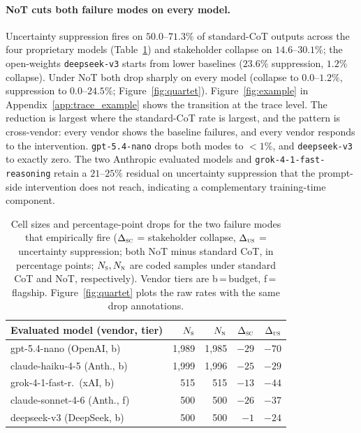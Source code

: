 \documentclass[11pt]{article}
\begin{document}
\paragraph{NoT cuts both failure modes on every model.}
Uncertainty suppression fires on $50.0$--$71.3\%$ of standard-CoT
outputs across the four proprietary models (Table~\ref{tab:firing})
and stakeholder collapse on $14.6$--$30.1\%$; the open-weights
\texttt{deepseek-v3} starts from lower baselines ($23.6\%$
suppression, $1.2\%$ collapse). Under NoT both drop
sharply on every model (collapse to $0.0$--$1.2\%$, suppression to
$0.0$--$24.5\%$;
Figure~\ref{fig:quartet}). Figure~\ref{fig:example} in
Appendix~\ref{app:trace_example} shows the transition at the trace
level. The reduction is largest where the
standard-CoT rate is largest, and the pattern is cross-vendor: every
vendor shows the baseline failures, and every vendor responds to the
intervention.
\texttt{gpt-5.4-nano} drops both modes to ${<}1\%$, and
\texttt{deepseek-v3} to exactly zero. The two Anthropic
evaluated models and \texttt{grok-4-1-fast-reasoning} retain a
$21$--$25\%$ residual on uncertainty suppression
that the prompt-side intervention does not reach, indicating a
complementary training-time component.

\begin{table}[t]
\centering
\small
\setlength{\tabcolsep}{4pt}
\begin{tabular}{lrrrr}
\toprule
Evaluated model (vendor, tier) & $N_{\textsc{s}}$ & $N_{\textsc{n}}$ & $\Delta_{\textsc{sc}}$ & $\Delta_{\textsc{us}}$ \\
\midrule
gpt-5.4-nano (OpenAI, b)        & 1{,}989 & 1{,}985 & $-29$ & $-70$ \\
claude-haiku-4-5 (Anth., b)     & 1{,}999 & 1{,}996 & $-25$ & $-29$ \\
grok-4-1-fast-r.\ (xAI, b)      &   515   &   515   & $-13$ & $-44$ \\
claude-sonnet-4-6 (Anth., f)    &   500   &   500   & $-26$ & $-37$ \\
deepseek-v3 (DeepSeek, b)       &   500   &   500   & $-1$  & $-24$ \\
\bottomrule
\end{tabular}
\caption{Cell sizes and percentage-point drops for the two failure
modes that empirically fire ($\Delta_{\textsc{sc}}$ = stakeholder
collapse, $\Delta_{\textsc{us}}$ = uncertainty suppression; both
NoT minus standard CoT, in percentage points;
$N_{\textsc{s}}, N_{\textsc{n}}$ are coded samples under standard CoT
and NoT, respectively). Vendor tiers are b\,=\,budget,
f\,=\,flagship. Figure~\ref{fig:quartet} plots the raw rates with
the same drop annotations.}
\label{tab:firing}
\end{table}
\end{document}
